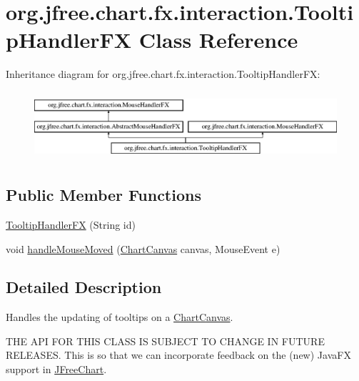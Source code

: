 \hypertarget{classorg_1_1jfree_1_1chart_1_1fx_1_1interaction_1_1_tooltip_handler_f_x}{}\section{org.\+jfree.\+chart.\+fx.\+interaction.\+Tooltip\+Handler\+FX Class Reference}
\label{classorg_1_1jfree_1_1chart_1_1fx_1_1interaction_1_1_tooltip_handler_f_x}
Inheritance diagram for org.\+jfree.\+chart.\+fx.\+interaction.\+Tooltip\+Handler\+FX\+:\begin{figure}[H]
\begin{center}
\leavevmode
\includegraphics[height=2.545455cm]{classorg_1_1jfree_1_1chart_1_1fx_1_1interaction_1_1_tooltip_handler_f_x}
\end{center}
\end{figure}
\subsection*{Public Member Functions}
\begin{DoxyCompactItemize}
\item 
\mbox{\hyperlink{classorg_1_1jfree_1_1chart_1_1fx_1_1interaction_1_1_tooltip_handler_f_x_a2e41c80df73bf407c348e6a2d429f5c2}{Tooltip\+Handler\+FX}} (String id)
\item 
void \mbox{\hyperlink{classorg_1_1jfree_1_1chart_1_1fx_1_1interaction_1_1_tooltip_handler_f_x_ae43d146d4ca535f1f1362ce4325ae41b}{handle\+Mouse\+Moved}} (\mbox{\hyperlink{classorg_1_1jfree_1_1chart_1_1fx_1_1_chart_canvas}{Chart\+Canvas}} canvas, Mouse\+Event e)
\end{DoxyCompactItemize}


\subsection{Detailed Description}
Handles the updating of tooltips on a \mbox{\hyperlink{classorg_1_1jfree_1_1chart_1_1fx_1_1_chart_canvas}{Chart\+Canvas}}.

T\+HE A\+PI F\+OR T\+H\+IS C\+L\+A\+SS IS S\+U\+B\+J\+E\+CT TO C\+H\+A\+N\+GE IN F\+U\+T\+U\+RE R\+E\+L\+E\+A\+S\+ES. This is so that we can incorporate feedback on the (new) Java\+FX support in \mbox{\hyperlink{classorg_1_1jfree_1_1chart_1_1_j_free_chart}{J\+Free\+Chart}}.

